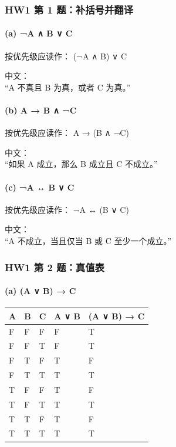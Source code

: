 \documentclass[
  11pt,
]{article}
\begin{document}
\subsubsection{HW1 第 1
题：补括号并翻译}\label{hw1-ux7b2c-1-ux9898ux8865ux62ecux53f7ux5e76ux7ffbux8bd1}

\paragraph{(a) ¬A ∧ B ∨ C}\label{a-a-b-c}

按优先级应读作： (¬A ∧ B) ∨ C

中文：\\
``A 不真且 B 为真，或者 C 为真。''

\paragraph{(b) A → B ∧ ¬C}\label{b-a-b-c}

按优先级应读作： A → (B ∧ ¬C)

中文：\\
``如果 A 成立，那么 B 成立且 C 不成立。''

\paragraph{(c) ¬A ↔ B ∨ C}\label{c-a-b-c}

按优先级应读作： ¬A ↔ (B ∨ C)

中文：\\
``A 不成立，当且仅当 B 或 C 至少一个成立。''

\subsubsection{HW1 第 2
题：真值表}\label{hw1-ux7b2c-2-ux9898ux771fux503cux8868}

\paragraph{(a) (A ∨ B) → C}\label{a-a-b-c-1}

\begin{longtable}[]{@{}lllll@{}}
\toprule\noalign{}
A & B & C & A ∨ B & (A ∨ B) → C \\
\midrule\noalign{}
\endhead
\bottomrule\noalign{}
\endlastfoot
F & F & F & F & T \\
F & F & T & F & T \\
F & T & F & T & F \\
F & T & T & T & T \\
T & F & F & T & F \\
T & F & T & T & T \\
T & T & F & T & F \\
T & T & T & T & T \\
\end{longtable}
\end{document}
